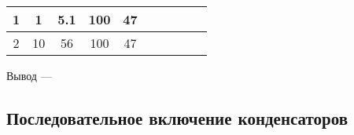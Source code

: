 \begin{table}[h]
\begin{tabular}{|c|cc|cc|c|cc|cc|}
1                  & \multicolumn{1}{c|}{1}                                                    & 5.1                                                  & \multicolumn{1}{c|}{100}                                                  & 47                                                   &                                                                              & \multicolumn{1}{c|}{}                                                                &                                                                    & \multicolumn{1}{c|}{}                                                                &                                                                    \\ \hline
2                  & \multicolumn{1}{c|}{10}                                                   & 56                                                   & \multicolumn{1}{c|}{100}                                                  & 47                                                   &                                                                              & \multicolumn{1}{c|}{}                                                                &                                                                    & \multicolumn{1}{c|}{}                                                                &                                                                    \\ \hline
\end{tabular}
\end{table}

Вывод --- \hrulefill

\hrulefill

\hrulefill

\subsection{Последовательное включение конденсаторов}

